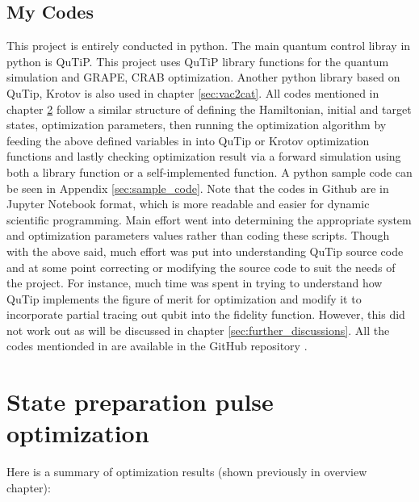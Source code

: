 \documentclass[12pt]{report}
\begin{document}
\section{My Codes}
This project is entirely conducted in python. The main quantum control libray in python is QuTiP.
This project uses QuTiP library functions for the quantum simulation and GRAPE, CRAB optimization.
Another python library based on QuTip, Krotov is also used in chapter \ref{sec:vac2cat}.
All codes mentioned in chapter \ref{sec:state_preparation} follow a similar structure of defining the Hamiltonian, initial and target states, optimization parameters, then running the optimization algorithm by feeding the above defined variables in into QuTip or Krotov optimization functions and lastly checking optimization result via a forward simulation using both a library function or a self-implemented function. 
A python sample code can be seen in Appendix \ref{sec:sample_code}. Note that the codes in Github are in Jupyter Notebook format, which is more readable and easier for dynamic scientific programming.
Main effort went into determining the appropriate system and optimization parameters values rather than coding these scripts. 
Though with the above said, much effort was put into understanding QuTip source code and at some point correcting or modifying the source code to suit the needs of the project.
For instance, much time was spent in trying to understand how QuTip implements the figure of merit for optimization and modify it to incorporate partial tracing out qubit into the fidelity function. 
However, this did not work out as will be discussed in chapter \ref{sec:further_discussions}.
All the codes mentionded in are available in the GitHub repository \cite{lzl_github_repo}.

\chapter{State preparation pulse optimization}\label{sec:state_preparation}
Here is a summary of optimization results (shown previously in overview chapter): 
\end{document}
